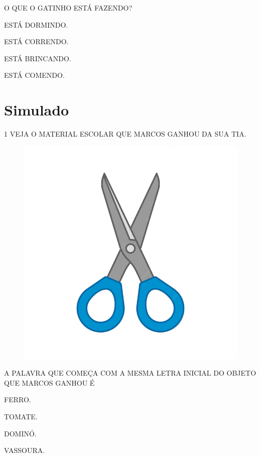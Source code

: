 O QUE O GATINHO ESTÁ FAZENDO?

\begin{escolha}

\item ESTÁ DORMINDO.

\item ESTÁ CORRENDO.

\item ESTÁ BRINCANDO.

\item ESTÁ COMENDO.

\end{escolha}

\chapter[Simulado 3]{Simulado}

\num{1} VEJA O MATERIAL ESCOLAR QUE MARCOS GANHOU DA SUA TIA.

\begin{figure}[H]
\centering
\includegraphics[width=.45\textwidth]{./media/image230.png}
\end{figure}

A PALAVRA QUE COMEÇA COM A MESMA LETRA INICIAL DO OBJETO QUE MARCOS GANHOU É

\begin{multicols}{2}
\begin{escolha}

\item FERRO.

\item TOMATE.

\item DOMINÓ.

\item VASSOURA.

\end{escolha}
\end{multicols}

